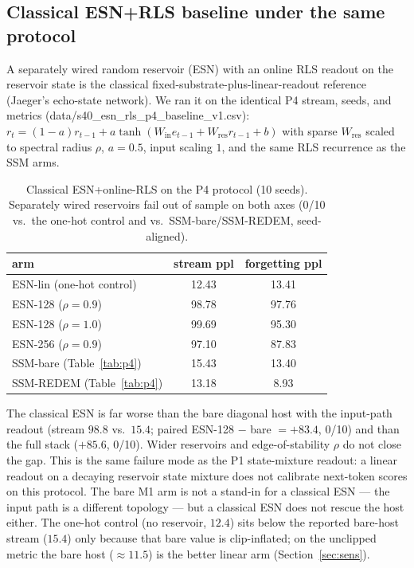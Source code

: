 \documentclass[preprint,12pt]{elsarticle}
\begin{document}
\subsection{Classical ESN+RLS baseline under the same protocol}
\label{sec:esn}

A separately wired random reservoir (ESN) with an online RLS readout on
the reservoir state is the classical fixed-substrate-plus-linear-readout
reference (Jaeger's echo-state network). We ran it on the identical P4
stream, seeds, and metrics (data/s40\_esn\_rls\_p4\_baseline\_v1.csv):
$r_t=(1-a)r_{t-1}+a\tanh(W_{\mathrm{in}}e_{t-1}+W_{\mathrm{res}}r_{t-1}+b)$
with sparse $W_{\mathrm{res}}$ scaled to spectral radius $\rho$, $a=0.5$,
input scaling $1$, and the same RLS recurrence as the SSM arms.

\begin{table}[t]
\centering
\small
\begin{tabular}{lcc}
\toprule
arm & stream ppl & forgetting ppl \\
\midrule
ESN-lin (one-hot control) & 12.43 & 13.41 \\
ESN-128 ($\rho=0.9$) & 98.78 & 97.76 \\
ESN-128 ($\rho=1.0$) & 99.69 & 95.30 \\
ESN-256 ($\rho=0.9$) & 97.10 & 87.83 \\
SSM-bare (Table~\ref{tab:p4}) & 15.43 & 13.40 \\
SSM-REDEM (Table~\ref{tab:p4}) & 13.18 & 8.93 \\
\bottomrule
\end{tabular}
\caption{Classical ESN+online-RLS on the P4 protocol (10 seeds).
Separately wired reservoirs fail out of sample on both axes (0/10 vs.\
the one-hot control and vs.\ SSM-bare/SSM-REDEM, seed-aligned).}
\label{tab:esn}
\end{table}

The classical ESN is far worse than the bare diagonal host with the
input-path readout (stream $98.8$ vs.\ $15.4$; paired
ESN-128 $-$ bare $=+83.4$, 0/10) and than the full stack
($+85.6$, 0/10). Wider reservoirs and edge-of-stability $\rho$ do not
close the gap. This is the same failure mode as the P1 state-mixture
readout: a linear readout on a decaying reservoir state mixture does not
calibrate next-token scores on this protocol. The bare M1 arm is not a
stand-in for a classical ESN --- the input path is a different topology
--- but a classical ESN does not rescue the host either. The one-hot
control (no reservoir, $12.4$) sits below the reported bare-host stream
($15.4$) only because that bare value is clip-inflated; on the unclipped
metric the bare host ($\approx 11.5$) is the better linear arm
(Section~\ref{sec:sens}).
\end{document}
